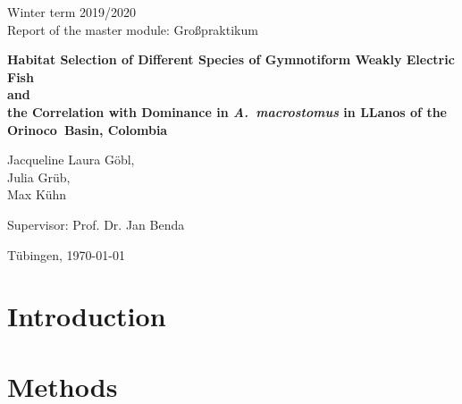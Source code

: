 \documentclass[12pt,a4paper,pdftex]{article}
\begin{document}
\setlength{\parindent}{0pt}

\begin{titlepage}
 \begin{center}
        \vspace{1cm}
        \Large
        Winter term 2019/2020\\
        Report of the master module: Großpraktikum
 
        \vspace*{4cm}
        \LARGE
        \textbf{Habitat Selection of Different Species of Gymnotiform Weakly Electric Fish}\\
        \vspace{0.25cm}
        \textbf{and}\\
        \vspace{0.25cm}
        \textbf{the Correlation with Dominance in \textit{A.~macrostomus} in LLanos of the Orinoco~Basin, Colombia}
        \vspace{5cm}
        
        \large
        Jacqueline Laura Göbl,\\ Julia Grüb,\\ Max Kühn
        \vspace{0.5cm}
        
        Supervisor: Prof. Dr. Jan Benda
        
        \vfill
        \large     
        T\"ubingen, \today
    \end{center}
    
\end{titlepage}


\thispagestyle{empty}
\mbox{}



\tableofcontents
\thispagestyle{empty}

\newpage
\section{Introduction}
 

\newpage
\section{Methods}
 
\end{document}
